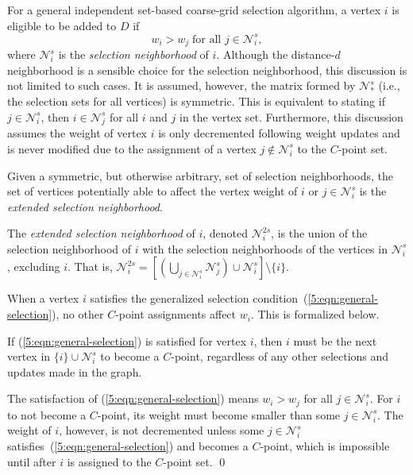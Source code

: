 \documentclass{elsart}
\newenvironment{proof}{\begin{pf}}{\qed\end{pf}}
\begin{document}
For a general independent set-based coarse-grid selection algorithm, a
vertex $i$ is eligible to be added to $D$ if
\begin{equation}
\label{5:eqn:general-selection}
w_i > w_j\;\textrm{for all } j \in \mathcal{N}_i^s,
\end{equation}
where $\mathcal{N}_i^s$ is the \emph{selection neighborhood} of
$i$. Although the distance-$d$ neighborhood is a sensible choice for
the selection neighborhood, this discussion is not limited to such
cases. It is assumed, however, the matrix formed by $\mathcal{N}_*^s$
(i.e., the selection sets for all vertices) is symmetric. This is
equivalent to stating if $j \in \mathcal{N}_i^s$, then $i \in
\mathcal{N}_j^s$ for all $i$ and $j$ in the vertex set. Furthermore,
this discussion assumes the weight of vertex $i$ is only decremented
following weight updates and is never modified due to the assignment
of a vertex $j \notin \mathcal{N}_i^s$ to the $C$-point set.

Given a symmetric, but otherwise arbitrary, set of selection
neighborhoods, the set of vertices potentially able to affect the
vertex weight of $i$ or $j \in \mathcal{N}_i^s$ is the \emph{extended
selection neighborhood}.
\begin{defn}
The \emph{extended selection neighborhood} of $i$, denoted
$\mathcal{N}_i^{2s}$, is the union of the selection neighborhood of
$i$ with the selection neighborhoods of the vertices in
$\mathcal{N}_i^s$, excluding $i$. That is, $\mathcal{N}_i^{2s} =
\left[\left(\bigcup_{j \in \mathcal{N}_i^s}\mathcal{N}_j^s\right)\cup
\mathcal{N}_i^s\right] \setminus \{i\}$.
\end{defn}

When a vertex $i$ satisfies the generalized selection
condition~(\ref{5:eqn:general-selection}), no other $C$-point
assignments affect $w_i$. This is formalized below.
\begin{lem}
\label{5:lemma:C-lock}
If (\ref{5:eqn:general-selection}) is satisfied for vertex $i$, then
$i$ must be the next vertex in $\{i\} \cup \mathcal{N}_i^s$ to become
a $C$-point, regardless of any other selections and updates made in
the graph.
\end{lem}
\begin{proof}
The satisfaction of (\ref{5:eqn:general-selection}) means $w_i > w_j$
for all $j \in \mathcal{N}_i^s$. For $i$ to not become a $C$-point,
its weight must become smaller than some $j \in \mathcal{N}_i^s$. The
weight of $i$, however, is not decremented unless some $j \in
\mathcal{N}_i^s$ satisfies~(\ref{5:eqn:general-selection}) and becomes
a $C$-point, which is impossible until after $i$ is assigned to the
$C$-point set.
\end{proof}
\end{document}

